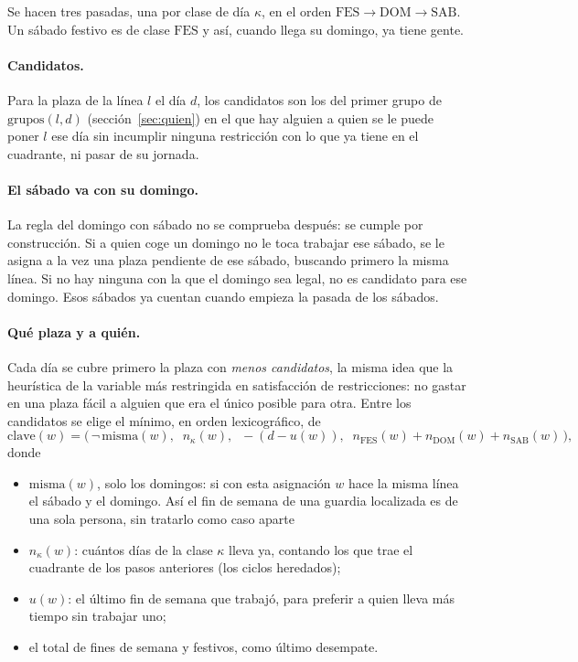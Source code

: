 \documentclass[11pt,a4paper]{article}
\begin{document}
Se hacen tres pasadas, una por clase de día $\kappa$, en el orden
$\mathrm{FES} \to \mathrm{DOM} \to \mathrm{SAB}$. Un sábado festivo es de clase $\mathrm{FES}$ y
así, cuando llega su domingo, ya tiene gente.

\paragraph{Candidatos.} Para la plaza de la línea $l$ el día $d$, los candidatos son los del
primer grupo de $\mathrm{grupos}(l,d)$ (sección~\ref{sec:quien}) en el que hay alguien a quien se
le puede poner $l$ ese día sin incumplir ninguna restricción con lo que ya tiene en el
cuadrante, ni pasar de su jornada.

\paragraph{El sábado va con su domingo.} La regla del domingo con sábado no se comprueba
después: se cumple por construcción. Si a quien coge un domingo no le toca trabajar ese sábado,
se le asigna a la vez una plaza pendiente de ese sábado, buscando primero la misma línea. Si no
hay ninguna con la que el domingo sea legal, no es candidato para ese domingo. Esos sábados ya
cuentan cuando empieza la pasada de los sábados.

\paragraph{Qué plaza y a quién.} Cada día se cubre primero la plaza con \emph{menos candidatos},
la misma idea que la heurística de la variable más restringida en satisfacción de restricciones:
no gastar en una plaza fácil a alguien que era el único posible para otra. Entre los candidatos
se elige el mínimo, en orden lexicográfico, de
\[
  \mathrm{clave}(w) = \bigl(\, \neg\,\mathrm{misma}(w),\;\; n_\kappa(w),\;\; -(d - u(w)),\;\;
  n_{\mathrm{FES}}(w) + n_{\mathrm{DOM}}(w) + n_{\mathrm{SAB}}(w) \,\bigr),
\]
donde
\begin{itemize}[nosep]
  \item $\mathrm{misma}(w)$, solo los domingos: si con esta asignación $w$ hace la misma línea el
        sábado y el domingo. Así el fin de semana de una guardia localizada es de una sola
        persona, sin tratarlo como caso aparte
  \item $n_\kappa(w)$: cuántos días de la clase $\kappa$ lleva ya, contando los que trae el
        cuadrante de los pasos anteriores (los ciclos heredados);
  \item $u(w)$: el último fin de semana que trabajó, para preferir a quien lleva más tiempo sin
        trabajar uno;
  \item el total de fines de semana y festivos, como último desempate.
\end{itemize}
\end{document}
